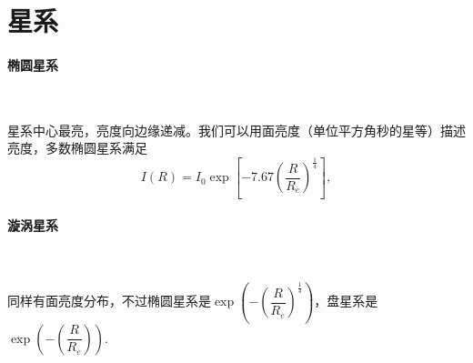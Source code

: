 \documentclass[../天体物理基础.tex]{subfiles}
\begin{document}
\section{星系}
\paragraph{椭圆星系}~{}

星系中心最亮，亮度向边缘递减。我们可以用面亮度（单位平方角秒的星等）描述亮度，多数椭圆星系满足
\begin{equation}
I\left(R\right)=I_{0}\exp\left[-7.67\left(\frac{R}{R_{e}}\right)^{\frac14}\right],
\end{equation}

\paragraph{漩涡星系}~{}


同样有面亮度分布，不过椭圆星系是$\exp\left(-\left(\dfrac{R}{R_{e}}\right)^{\frac14}\right)$，盘星系是$\exp\left(-\left(\dfrac{R}{R_{e}}\right)\right)$.


\printbibliography
\end{document}
